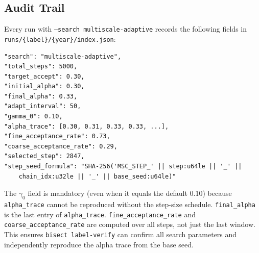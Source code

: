 \subsection{Audit Trail}

Every run with \texttt{--search multiscale-adaptive} records the following
fields in \texttt{runs/\{label\}/\{year\}/index.json}:

\begin{verbatim}
"search": "multiscale-adaptive",
"total_steps": 5000,
"target_accept": 0.30,
"initial_alpha": 0.30,
"final_alpha": 0.33,
"adapt_interval": 50,
"gamma_0": 0.10,
"alpha_trace": [0.30, 0.31, 0.33, 0.33, ...],
"fine_acceptance_rate": 0.73,
"coarse_acceptance_rate": 0.29,
"selected_step": 2847,
"step_seed_formula": "SHA-256('MSC_STEP_' || step:u64le || '_' ||
    chain_idx:u32le || '_' || base_seed:u64le)"
\end{verbatim}

The $\gamma_0$ field is mandatory (even when it equals the default 0.10)
because \texttt{alpha\_trace} cannot be reproduced without the step-size
schedule.
\texttt{final\_alpha} is the last entry of \texttt{alpha\_trace}.
\texttt{fine\_acceptance\_rate} and \texttt{coarse\_acceptance\_rate} are
computed over all steps, not just the last window.
This ensures \texttt{bisect label-verify} can confirm all search parameters
and independently reproduce the alpha trace from the base seed.
